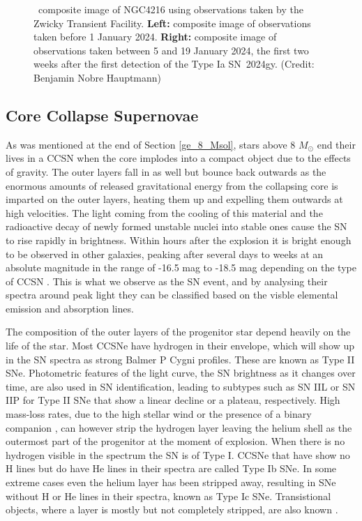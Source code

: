 \documentclass[a4paper,oneside,12pt, class=Latex/Classes/PhDthesisPSnPDF, crop=false]{standalone}
\begin{document}
\begin{figure}
    \caption{\ztfg\ztfr\ztfi\ composite image of NGC4216 using observations taken by the Zwicky Transient Facility. \textbf{Left:} composite image of observations taken before 1 January 2024. \textbf{Right:} composite image of observations taken between 5 and 19 January 2024, the first two weeks after the first detection of the Type Ia SN~2024gy. (Credit: Benjamin Nobre Hauptmann)} %
    \label{2024gy_ZTF}
\end{figure}


\subsection{Core Collapse Supernovae}
\label{CCSN}
As was mentioned at the end of Section \ref{ge_8_Msol}, stars above 8 $M_\odot$ end their lives in a CCSN when the core implodes into a compact object due to the effects of gravity. The outer layers fall in as well but bounce back outwards as the enormous amounts of released gravitational energy from the collapsing core is imparted on the outer layers, heating them up and expelling them outwards at high velocities. The light coming from the cooling of this material and the radioactive decay of newly formed unstable nuclei into stable ones cause the SN to rise rapidly in brightness. Within hours after the explosion it is bright enough to be observed in other galaxies, peaking after several days to weeks at an absolute magnitude in the range of -16.5 mag to -18.5 mag depending on the type of CCSN \citep{SN_M_dist}. This is what we observe as the SN event, and by analysing their spectra around peak light they can be classified based on the visble elemental emission and absorption lines.

The composition of the outer layers of the progenitor star depend heavily on the life of the star. Most CCSNe have hydrogen in their envelope, which will show up in the SN spectra as strong Balmer P Cygni profiles. These are known as Type II SNe. Photometric features of the light curve, the SN brightness as it changes over time, are also used in SN identification, leading to subtypes such as SN IIL or SN IIP for Type II SNe that show a linear decline or a plateau, respectively. High mass-loss rates, due to the high stellar wind \citep{He-star_pre_SN_evol_mass_loss} or the presence of a binary companion \citep{He-star_pre_SN_evol_binaries}, can however strip the hydrogen layer leaving the helium shell as the outermost part of the progenitor at the moment of explosion. When there is no hydrogen visible in the spectrum the SN is of Type I. CCSNe that have show no H lines but do have He lines in their spectra are called Type Ib SNe. In some extreme cases even the helium layer has been stripped away, resulting in SNe without H or He lines in their spectra, known as Type Ic SNe. Transistional objects, where a layer is mostly but not completely stripped, are also known \citep{SN_large_pic}.
\end{document}
